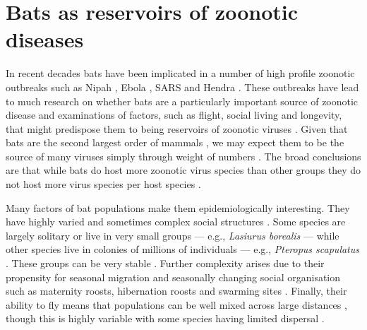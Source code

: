 
\section{Bats as reservoirs of zoonotic diseases}


In recent decades bats have been implicated in a number of high profile zoonotic outbreaks such as Nipah \cite{field2001natural, halpin2011pteropid}, Ebola \cite{leroy2005fruit}, SARS \cite{li2005bats} and Hendra \cite{field2001natural}.
These outbreaks have lead to much research on whether bats are a particularly important source of zoonotic disease \cite{luis2013comparison, olival2015bats, wang2011mass} and examinations of factors, such as flight, social living and longevity, that might predispose them to being reservoirs of zoonotic viruses \cite{calisher2006bats, o2014bat, dobson2005links, racey2015uniqueness, kuzmin2011bats}.
Given that bats are the second largest order of mammals \cite{wilson2005mammal}, we may expect them to be the source of many viruses simply through weight of numbers \cite{luis2013comparison}.
The broad conclusions are that while bats do host more zoonotic virus species than other groups \cite{luis2013comparison} they do not host more virus species per host species \cite{olival2015bats}.


Many factors of bat populations make them epidemiologically interesting.
They have highly varied and sometimes complex social structures \cite{kerth2008causes}.
Some species are largely solitary or live in very small groups --- e.g., \emph{Lasiurus borealis} \cite{shump1982lasiurus} --- while other species live in colonies of millions of individuals --- e.g., \emph{Pteropus scapulatus} \cite{birt2008little}.
These groups can be very stable \cite{kerth2011bats, mccracken1981social}.
Further complexity arises due to their propensity for seasonal migration \cite{fleming2003ecology, richter2008first, cryan2014continental} and seasonally changing social organisation such as maternity roosts, hibernation roosts and swarming sites \cite{kerth2008causes}.
Finally, their ability to fly means that populations can be well mixed across large distances \cite{peel2013continent, petit1999male}, though this is highly variable with some species having limited dispersal \cite{wilmer1994extreme}.

